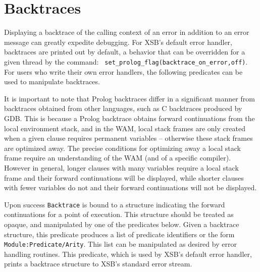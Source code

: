 \section{Backtraces}
\label{sec:backtrace}

%
Displaying a backtrace of the calling context of an error in addition
to an error message can greatly expedite debugging.  For XSB's default
error handler, backtraces are printed out by default, a behavior that
can be overridden for a given thread by the command: {\tt
  set\_prolog\_flag(backtrace\_on\_error,off)}.  For users who write
their own error handlers, the following predicates can be used to
manipulate backtraces.

It is important to note that Prolog backtraces differ in a significant
manner from backtraces obtained from other languages, such as C
backtraces produced by GDB.  This is because a Prolog backtrace
obtains forward continuations from the local environment stack, and in
the WAM, local stack frames are only created when a given clause
requires permanent variables -- otherwise these stack frames are
optimized away.  The precise conditions for optimizing away a local
stack frame require an understanding of the WAM (and of a specific
compiler).  However in general, longer clauses with many variables
require a local stack frame and their forward continuations will be
displayed, while shorter clauses with fewer variables do not and their
forward continuations will not be displayed.

\begin{description}
%
Upon success {\tt Backtrace} is bound to a structure indicating the
forward continuations for a point of execution.  This structure should
be treated as opaque, and manipulated by one of the predicates below.
%
%
Given a backtrace structure, this predicate produces a list of
predicate identifiers or the form {\tt Module:Predicate/Arity}.  This
list can be manipulated as desired by error handling routines.
%
%
 This predicate, which is used by XSB's default error handler, prints
 a backtrace structure to XSB's standard error stream.
\end{description}
